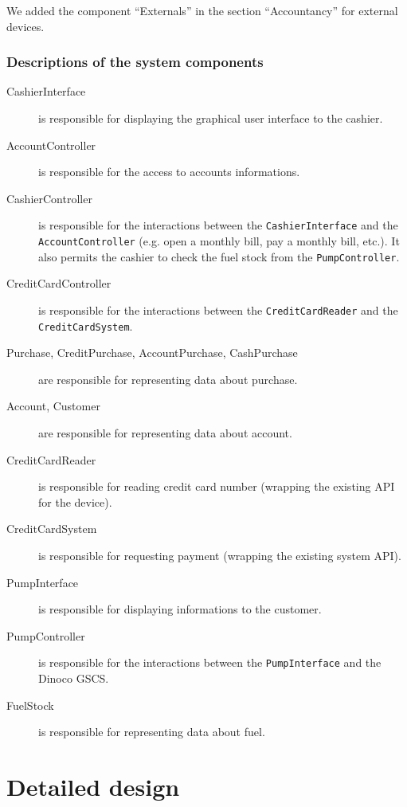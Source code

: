 \documentclass[11pt, a4paper]{article}
\newcommand{\settextlisting}{\lstset{ basicstyle=\small\ttfamily }}
\begin{document}
We added the component ``Externals'' in the section ``Accountancy'' for external devices.\\


\subsubsection*{Descriptions of the system components}
\settextlisting
\begin{description}
\item[CashierInterface] is responsible for displaying the graphical user interface to the cashier.

\item[AccountController] is responsible for the access to accounts informations.


\item[CashierController] is responsible for the interactions between the \lstinline|CashierInterface| and the \lstinline|AccountController| (e.g. open a monthly bill, pay a monthly bill, etc.). It also permits the cashier to check the fuel stock from the \lstinline|PumpController|.

\item[CreditCardController] is responsible for the interactions between the \lstinline|CreditCardReader| and the \lstinline|CreditCardSystem|.

\item[Purchase, CreditPurchase, AccountPurchase, CashPurchase] are responsible for representing data about purchase.
\item[Account, Customer] are responsible for representing data about account.
\item[CreditCardReader] is responsible for reading credit card number (wrapping the existing API for the device).
\item[CreditCardSystem] is responsible for requesting payment (wrapping the existing system API).

\item[PumpInterface] is responsible for displaying informations to the customer.
\item[PumpController] is responsible for the interactions between the \lstinline|PumpInterface| and the Dinoco GSCS.
\item[FuelStock] is responsible for representing data about fuel.
\end{description}

\section{Detailed design}
\end{document}

